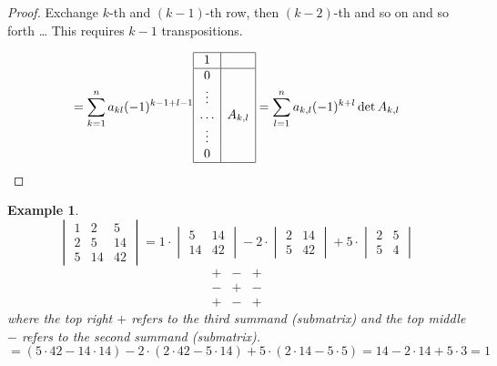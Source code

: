 \documentclass[a4paper,landscape,twocolumn]{article}
\newtheorem{ex}{Example}
\begin{document}
\begin{proof}
  Exchange $k$-th and $(k-1)$-th row, then $(k-2)$-th and so on and so forth \dots
  This requires $k-1$ transpositions.

  \[
    = \sum_{k=1}^n a_{kl} (-1)^{k-1+l-1}
    \begin{array}{|c|c|}
    \hline
      1 & \\
    \hline
      0 & \\
      \vdots & \\
      \ldots & A_{k,l} \\
      \vdots & \\
      0 & \\
    \hline
    \end{array}
    = \sum_{l=1}^n a_{k,l} (-1)^{k+l} \det{A_{k,l}}
  \]
\end{proof}

\begin{ex}
  \[
    \begin{vmatrix}
      1 & 2 & 5 \\
      2 & 5 & 14 \\
      5 & 14 & 42
    \end{vmatrix}
    =
    1 \cdot \begin{vmatrix}
      5 & 14 \\
      14 & 42
    \end{vmatrix} - 2 \cdot \begin{vmatrix}
      2 & 14 \\
      5 & 42
    \end{vmatrix} + 5 \cdot \begin{vmatrix}
      2 & 5 \\
      5 & 4
    \end{vmatrix}
  \] \[
    \begin{array}{|c|c|c|}
      + & - & + \\
    \hline
      - & + & - \\
    \hline
      + & - & +
    \end{array}
  \]
  where the top right $+$ refers to the third summand (submatrix)
  and the top middle $-$ refers to the second summand (submatrix).
  \[
    = (5 \cdot 42 - 14\cdot 14) - 2 \cdot (2 \cdot 42 - 5 \cdot 14) + 5 \cdot (2 \cdot 14 - 5 \cdot 5)
    = 14 - 2 \cdot 14 + 5 \cdot 3 = 1
  \]
\end{ex}
\end{document}
